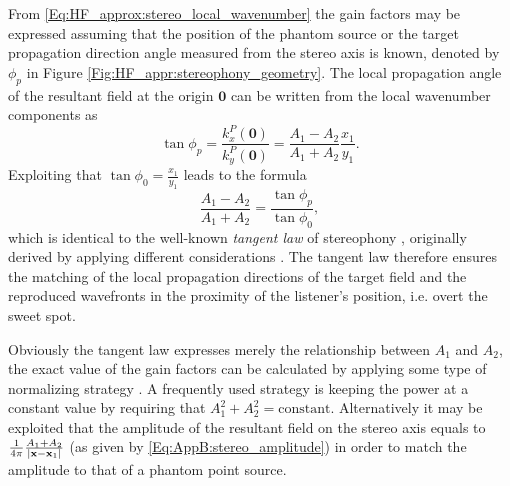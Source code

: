 From \eqref{Eq:HF_approx:stereo_local_wavenumber} the gain factors may be expressed assuming that the position of the phantom source or the target propagation direction angle measured from the stereo axis is known, denoted by $\phi_p$ in Figure \eqref{Fig:HF_appr:stereophony_geometry}.
The local propagation angle of the resultant field at the origin $\mathbf{0}$ can be written from the local wavenumber components as
\begin{equation}
\tan \phi_p = \frac{k_x^P(\mathbf{0})}{k_y^P(\mathbf{0})} = \frac{A_1-A_2}{A_1+A_2}\frac{x_1}{y_1}.
\end{equation}
Exploiting that $\tan \phi_0 = \frac{x_1}{y_1}$ leads to the formula
\begin{equation}
\frac{A_1 - A_2}{A_1 + A_2} = \frac{\tan \phi_p}{\tan \phi_0},
\end{equation}
which is identical to the well-known \emph{tangent law} of stereophony \cite{SpringerHandbookSpeech2008, Pulkki1997, Pulkki2001a, Pulkki2001:phd}, originally derived by applying different considerations \cite{Bennett1985}.
The tangent law therefore ensures the matching of the local propagation directions of the target field and the reproduced wavefronts in the proximity of the listener's position, i.e. overt the sweet spot.

Obviously the tangent law expresses merely the relationship between $A_1$ and $A_2$, the exact value of the gain factors can be calculated by applying some type of normalizing strategy \cite{Moore1990}.
A frequently used strategy is keeping the power at a constant value by requiring that $A_1^2 + A_2^2 = \text{constant}$.
Alternatively it may be exploited that the amplitude of the resultant field on the stereo axis equals to $\frac{1}{4\pi}\frac{A_1+A_2}{|\mathbf{x}-\mathbf{x}_1|}$ (as given by \eqref{Eq:AppB:stereo_amplitude}) in order to match the amplitude to that of a phantom point source.

